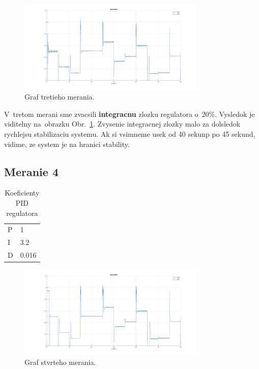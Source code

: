 \documentclass{article}
\begin{document}
\begin{figure}[!htbp]
	\begin{center}
		\includegraphics[width=0.8\textwidth]{./include/m4.png}
	\end{center}
	\caption{Graf tretieho merania.}
	\label{fig:meranie3}
\end{figure}

V~tretom merani sme zvacsili \textbf{integracnu} zlozku regulatora o~20\%. Vysledok je viditelny
na~obrazku Obr.~\ref{fig:meranie3}. Zvysenie integracnej zlozky malo za dolsledok rychlejsu stabilizaciu
systemu. Ak si vsimneme usek od 40 sekunp po 45 sekund, vidime, ze system je na hranici stability.

\clearpage

\subsection{Meranie 4}
\label{sec:meranie4}

\begin{table}[!htbp]
	\caption{Koeficienty PID regulatora}
	\label{tab:t4}
	\begin{center}
		\begin{tabular}[c]{|l|l|}
			\hline
			P & 1 \\
			I & 3.2 \\
			D & 0.016 \\
			\hline
		\end{tabular}
	\end{center}
\end{table}

\begin{figure}[!htbp]
	\begin{center}
		\includegraphics[width=0.8\textwidth]{./include/m6.png}
	\end{center}
	\caption{Graf stvrteho merania.}
	\label{fig:meranie4}
\end{figure}
\end{document}
